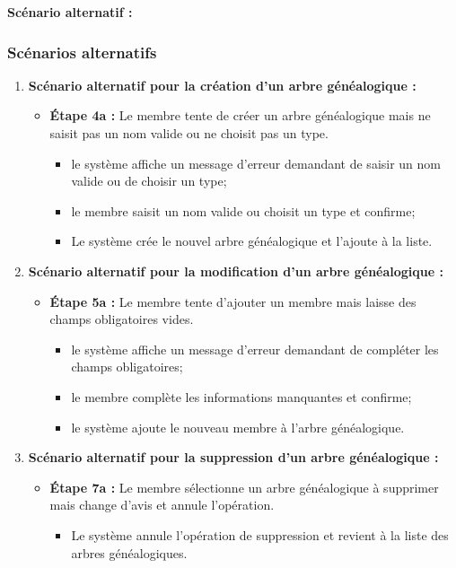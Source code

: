 \textbf{Scénario alternatif :}

\subsubsection*{Scénarios alternatifs}

\begin{enumerate}
    \item \textbf{Scénario alternatif pour la création d'un arbre généalogique :}
    \begin{itemize}
        \item \textbf{Étape 4a :} Le membre tente de créer un arbre
          généalogique mais ne saisit pas un nom valide ou ne choisit pas un type.
        \begin{itemize}
            \item le système affiche un message d'erreur demandant de saisir
              un nom valide ou de choisir un type;
            \item le membre saisit un nom valide ou choisit un type et confirme;
            \item Le système crée le nouvel arbre généalogique et l'ajoute à la liste.
        \end{itemize}
    \end{itemize}

    \item \textbf{Scénario alternatif pour la modification d'un arbre généalogique :}
    \begin{itemize}
        \item \textbf{Étape 5a :} Le membre tente d'ajouter un membre mais
          laisse des champs obligatoires vides.
        \begin{itemize}
            \item le système affiche un message d'erreur demandant de compléter les champs obligatoires;
            \item le membre complète les informations manquantes et confirme;
            \item le système ajoute le nouveau membre à l'arbre généalogique.
        \end{itemize}
    \end{itemize}

    \item \textbf{Scénario alternatif pour la suppression d'un arbre généalogique :}
    \begin{itemize}
        \item \textbf{Étape 7a :} Le membre sélectionne un arbre généalogique à supprimer mais change d'avis et annule l'opération.
        \begin{itemize}
            \item Le système annule l'opération de suppression et revient à la liste des arbres généalogiques.
        \end{itemize}
    \end{itemize}


\end{enumerate}
